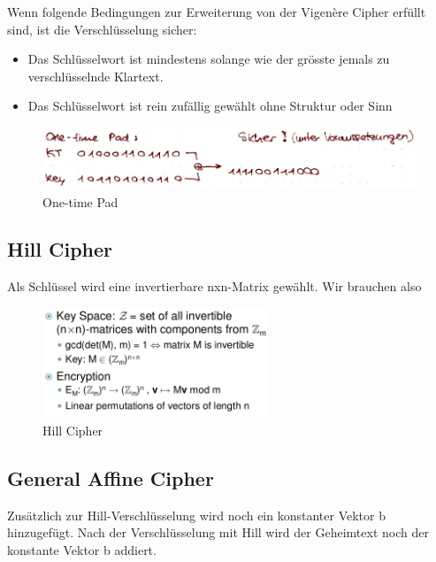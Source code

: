 Wenn folgende Bedingungen zur Erweiterung von der Vigenère Cipher
erfüllt sind, ist die Verschlüsselung sicher: 
\begin{itemize}
    \item Das Schlüsselwort ist mindestens solange wie der grösste jemals zu verschlüsselnde Klartext.
    \item Das Schlüsselwort ist rein zufällig gewählt ohne Struktur oder Sinn
\end{itemize}

\begin{figure}[H]
\centering
\includegraphics[width=1\textwidth]{figures/onetimePad.png}
\caption{One-time Pad}
\end{figure}

\hypertarget{hill-cipher}{%
\subsection{Hill Cipher}\label{hill-cipher}}

Als Schlüssel wird eine invertierbare nxn-Matrix gewählt. Wir brauchen also

\begin{figure}[H]
\centering
\includegraphics[width=0.6\textwidth]{figures/hillCipher.png}
\caption{Hill Cipher}
\end{figure}

\hypertarget{general-affine-cipher}{%
\subsection{General Affine Cipher}\label{general-affine-cipher}}

Zusätzlich zur Hill-Verschlüsselung wird noch ein konstanter Vektor b hinzugefügt. Nach der Verschlüsselung mit Hill wird der Geheimtext noch der konstante Vektor b addiert.

